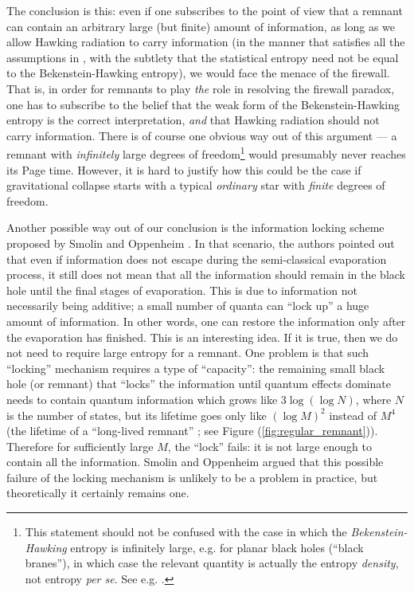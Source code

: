 \documentclass[12pt]{article}
\newcommand{\2}{$^2$}
\newcommand{\3}{$^3$}
\newcommand{\4}{$_4$}
\newcommand{\5}{$_5$}
\begin{document}
The conclusion is this: even if one subscribes to the point of view that a remnant can contain an arbitrary large (but finite) amount of information, as long as we allow Hawking radiation to carry information (in the manner that satisfies all the assumptions in \cite{amps}, with the subtlety that the statistical entropy need not be equal to the Bekenstein-Hawking entropy), we would face the menace of the firewall. That is, in order for remnants to play \emph{the} role in resolving the firewall paradox, one has to subscribe to the belief that the weak form of the Bekenstein-Hawking entropy is the correct interpretation, \emph{and} that Hawking radiation should not carry information. There is of course one obvious way out of this argument --- a remnant with \emph{infinitely} large degrees of freedom\footnote{This statement should not be confused with the case in which the \emph{Bekenstein-Hawking} entropy is infinitely large, e.g. for planar black holes (``black branes''), in which case the relevant quantity is actually the entropy \emph{density}, not entropy \emph{per se}. See e.g. \cite{kn:son}.} would presumably never reaches its Page time. However, it is hard to justify how this could be the case if gravitational collapse starts with a typical \emph{ordinary} star with \emph{finite} degrees of freedom. 

Another possible way out of our conclusion is the information locking scheme proposed by Smolin and Oppenheim \cite{SmoOpp}. In that scenario, the authors pointed out that even if information does not escape during the semi-classical evaporation process, it still does not mean that all the
information should remain in the black hole until the final stages of evaporation. This is due to information not necessarily being additive; a small number
of quanta can ``lock up'' a huge amount of information. In other words, one can restore the information only after the evaporation has finished. This is an interesting idea. If it is true, then we do not need to require large entropy for a remnant. One problem is that such ``locking'' mechanism requires a type of ``capacity'': the remaining small black hole (or remnant) that ``locks'' the information until quantum effects dominate needs to contain quantum information which grows like $3 \log(\log N)$, where $N$ is the number of states, but its lifetime goes only like $(\log M)^2$ instead of $M^4$ (the lifetime of  a ``long-lived remnant'' \cite{CW}; see Figure (\ref{fig:regular_remnant})). Therefore for sufficiently large $M$, the ``lock'' fails: it is not large enough to contain all the information. Smolin and Oppenheim argued that this possible failure of the locking mechanism is unlikely to be a problem in practice, but theoretically it certainly remains one.
\end{document}
